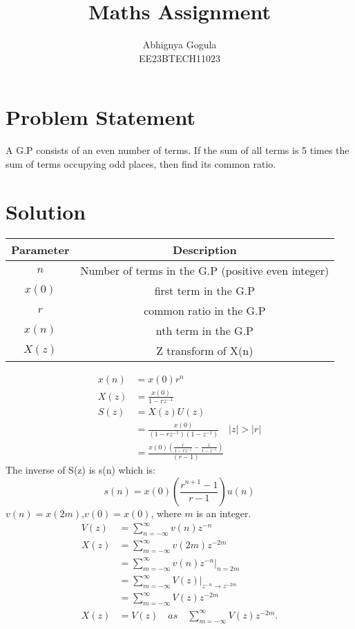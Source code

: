 \documentclass{article}
\begin{document}
\title{Maths Assignment}
\author{Abhignya Gogula\\
        EE23BTECH11023}
\maketitle
\section*{Problem Statement}
A G.P consists of an even number of terms. If the sum of all terms is 5 times the sum of terms occupying odd places, then find its common ratio.
\section*{Solution}
\begin{table}[h!]
\centering
\begin{tabular}{|c|c|}
\hline
Parameter & Description \\
\hline
\( n \) & Number of terms in the G.P (positive even integer) \\
\hline
\(x(0) \) & first term in the G.P \\
\hline
\( r \) & common ratio in the G.P \\
\hline
\( x(n) \) & nth term in the G.P \\
\hline
\( X(z) \) & Z transform of X(n) \\
\hline
\end{tabular}
\end{table}
\begin{align}
x(n) &= x(0)r^n \\
X(z) &= \frac{x(0)}{1-rz^{-1}} \\
S(z) &= X(z)U(z) \\
     &= \frac{x(0)}{(1-rz^{-1})(1-z^{-1})} \quad \lvert z \rvert > \lvert r \rvert \\
     &= \frac{x(0)(\frac{r}{1-rz^{-1}}-\frac{1}{1-z^{-1}})}{(r-1)}
\end{align}
The inverse of S(z) is s(n) which is:
\begin{equation}
s(n) = x(0)(\frac{r^{n+1}-1}{r-1})u(n)
\label{eq:eq1}
\end{equation}
\(v(n)=x(2m)\),\(v(0)=x(0)\), where \(m\) is an integer.\\
\begin{align}
V(z) & = \sum_{n=-\infty}^{\infty} v(n)z^{-n} \\
X(z) & = \sum_{m=-\infty}^{\infty} v(2m)z^{-2m} \\
     & = \sum_{m=-\infty}^{\infty} v(n)z^{-n} \Bigg|_{n=2m} \\
     & = \sum_{m=-\infty}^{\infty} V(z) \Bigg|_{z^{-n} \rightarrow z^{-2m}} \\
     & = \sum_{m=-\infty}^{\infty} V(z)z^{-2m}\\
X(z) &= V(z) \quad as \quad \sum_{m=-\infty}^{\infty} V(z)z^{-2m}.
\end{align}
\end{document}
